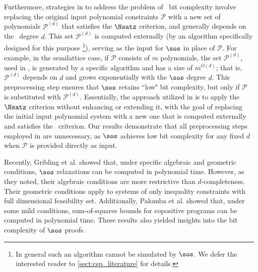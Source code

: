 \documentclass[11pt]{article}
\begin{document}
Furthermore, strategies in \cite{BharathiM21,BulatovRSTOC22,BulatovARXIV21, Mastrolilli21TALG} to address the problem of \sos\ bit complexity involve replacing the original input polynomial constraints \(\mathcal{P}\) with a new set of polynomials $\mathcal{P}^{(d)}$ that satisfies the \(\Nsatz\) criterion, and generally depends on the \sos\ degree \(d\). This set $\mathcal{P}^{(d)}$ is computed externally (by an algorithm specifically designed for this purpose \footnote{In general such an algorithm cannot be simulated by $\sos$. We defer the interested reader to \cref{sect:csp_literature} for details.}), serving as the input for \(\sos\) in place of $\mathcal{P}$. For example, in the semilattice case, if $\mathcal{P}$ consists of $m$ polynomials, the set $\mathcal{P}^{(d)}$, used in \cite{BulatovRSTOC22,Mastrolilli21TALG}, is generated by a specific algorithm and has a size of \( m^{O(d)} \); that is, $\mathcal{P}^{(d)}$ depends on \( d \) and grows exponentially with the \(\sos\) degree \( d \). This preprocessing step ensures that \(\sos\) retains ``low" bit complexity, but only if $\mathcal{P}$ is substituted with $\mathcal{P}^{(d)}$. Essentially, the approach utilized in \cite{BharathiM21,BulatovRSTOC22,BulatovARXIV21, Mastrolilli21TALG} is to apply the \(\Nsatz\) criterion without enhancing or extending it, with the goal of replacing the initial input polynomial system with a new one that is computed externally and satisfies the \Nsatz\ criterion.
Our results demonstrate that all preprocessing steps employed in \cite{BharathiM21,BulatovRSTOC22,Mastrolilli21TALG} are unnecessary, as \(\sos\) achieves low bit complexity for any fixed \( d \) when \(\mathcal{P}\) is provided directly as input.

Recently, Gribling et al. \cite{Gribling23} showed that, under specific algebraic and geometric conditions, $\sos$ relaxations can be computed in polynomial time. However, as they noted, their algebraic conditions are more restrictive than $d$-completeness. Their geometric conditions apply to systems of only inequality constraints with full dimensional feasibility set.  Additionally, Palomba et al. \cite{palomba} showed that, under some mild conditions, sum-of-squares bounds for copositive programs can be computed in polynomial time. These results also yielded insights into the bit complexity of $\sos$ proofs.
\end{document}
